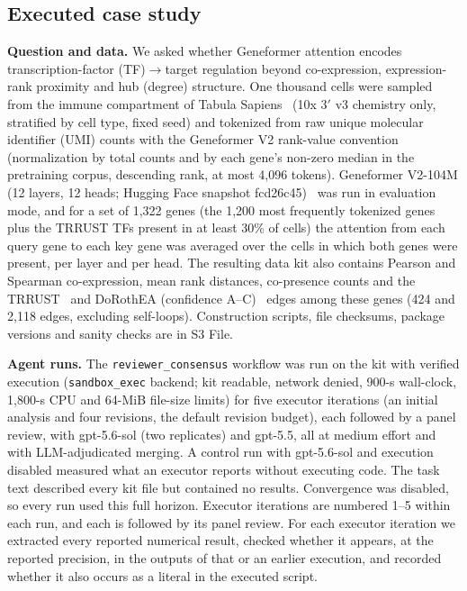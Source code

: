 \documentclass[10pt,letterpaper]{article}
\begin{document}
\subsection*{Executed case study}

\textbf{Question and data.} We asked whether Geneformer attention encodes transcription-factor (TF)$\to$target regulation beyond co-expression, expression-rank proximity and hub (degree) structure. One thousand cells were sampled from the immune compartment of Tabula Sapiens~\cite{tabulasapiens2022} (10x 3$'$ v3 chemistry only, stratified by cell type, fixed seed) and tokenized from raw unique molecular identifier (UMI) counts with the Geneformer V2 rank-value convention (normalization by total counts and by each gene's non-zero median in the pretraining corpus, descending rank, at most 4,096 tokens). Geneformer V2-104M (12 layers, 12 heads; Hugging Face snapshot fcd26c45)~\cite{theodoris2023transfer} was run in evaluation mode, and for a set of 1,322 genes (the 1,200 most frequently tokenized genes plus the TRRUST TFs present in at least 30\% of cells) the attention from each query gene to each key gene was averaged over the cells in which both genes were present, per layer and per head. The resulting data kit also contains Pearson and Spearman co-expression, mean rank distances, co-presence counts and the TRRUST~\cite{han2018trrust} and DoRothEA (confidence A--C)~\cite{garciaalonso2019dorothea} edges among these genes (424 and 2,118 edges, excluding self-loops). Construction scripts, file checksums, package versions and sanity checks are in S3 File.

\textbf{Agent runs.} The \texttt{reviewer\_consensus} workflow was run on the kit with verified execution (\texttt{sandbox\_exec} backend; kit readable, network denied, 900-s wall-clock, 1,800-s CPU and 64-MiB file-size limits) for five executor iterations (an initial analysis and four revisions, the default revision budget), each followed by a panel review, with gpt-5.6-sol (two replicates) and gpt-5.5, all at medium effort and with LLM-adjudicated merging. A control run with gpt-5.6-sol and execution disabled measured what an executor reports without executing code. The task text described every kit file but contained no results. Convergence was disabled, so every run used this full horizon. Executor iterations are numbered 1--5 within each run, and each is followed by its panel review. For each executor iteration we extracted every reported numerical result, checked whether it appears, at the reported precision, in the outputs of that or an earlier execution, and recorded whether it also occurs as a literal in the executed script.
\end{document}
